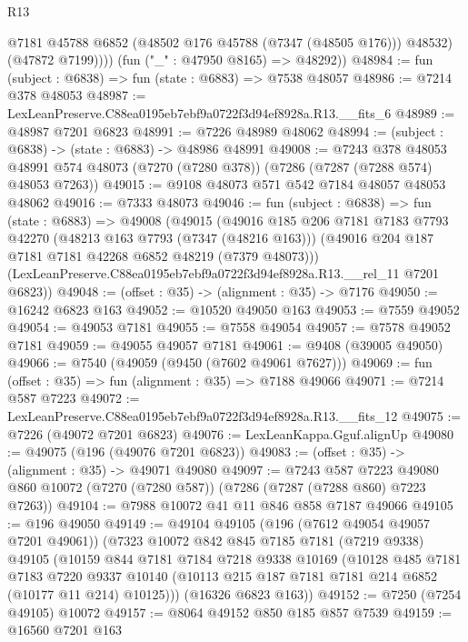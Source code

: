 \begin{lexlean}{R13}
\begin{coremodule}
              @7181
              @45788
              @6852
              (@48502 @176 @45788 (@7347 (@48505 @176)))
              @48532)
            (@47872 @7199))))
      (fun ("_" : @47950 @8165) => @48292))
@48984 := fun (subject : @6838) => fun (state : @6883) => @7538 @48057
@48986 := @7214 @378 @48053
@48987 := LexLeanPreserve.C88ea0195eb7ebf9a0722f3d94ef8928a.R13.__fits_6
@48989 := @48987 @7201 @6823
@48991 := @7226 @48989 @48062
@48994 := (subject : @6838) -> (state : @6883) -> @48986 @48991
@49008 := @7243
    @378
    @48053
    @48991
    @574
    @48073
    (@7270 (@7280 @378))
    (@7286 (@7287 (@7288 @574) @48053 @7263))
@49015 := @9108 @48073 @571 @542 @7184 @48057 @48053 @48062
@49016 := @7333 @48073
@49046 := fun (subject : @6838) =>
  fun (state : @6883) =>
  @49008
    (@49015
      (@49016
        @185
        @206
        @7181
        @7183
        @7793
        @42270
        (@48213 @163 @7793 (@7347 (@48216 @163)))
        (@49016 @204 @187 @7181 @7181 @42268 @6852 @48219 (@7379 @48073)))
      (LexLeanPreserve.C88ea0195eb7ebf9a0722f3d94ef8928a.R13.__rel_11 @7201 @6823))
@49048 := (offset : @35) -> (alignment : @35) -> @7176
@49050 := @16242 @6823 @163
@49052 := @10520 @49050 @163
@49053 := @7559 @49052
@49054 := @49053 @7181
@49055 := @7558 @49054
@49057 := @7578 @49052 @7181
@49059 := @49055 @49057 @7181
@49061 := @9408 (@39005 @49050)
@49066 := @7540 (@49059 (@9450 (@7602 @49061 @7627)))
@49069 := fun (offset : @35) => fun (alignment : @35) => @7188 @49066
@49071 := @7214 @587 @7223
@49072 := LexLeanPreserve.C88ea0195eb7ebf9a0722f3d94ef8928a.R13.__fits_12
@49075 := @7226 (@49072 @7201 @6823)
@49076 := LexLeanKappa.Gguf.alignUp
@49080 := @49075 (@196 (@49076 @7201 @6823))
@49083 := (offset : @35) -> (alignment : @35) -> @49071 @49080
@49097 := @7243
    @587
    @7223
    @49080
    @860
    @10072
    (@7270 (@7280 @587))
    (@7286 (@7287 (@7288 @860) @7223 @7263))
@49104 := @7988 @10072 @41 @11 @846 @858 @7187 @49066
@49105 := @196 @49050
@49149 := @49104
    @49105
    (@196 (@7612 @49054 @49057 @7201 @49061))
    (@7323
      @10072
      @842
      @845
      @7185
      @7181
      (@7219 @9338)
      @49105
      (@10159
        @844
        @7181
        @7184
        @7218
        @9338
        @10169
        (@10128
          @485
          @7181
          @7183
          @7220
          @9337
          @10140
          (@10113 @215 @187 @7181 @7181 @214 @6852 (@10177 @11 @214) @10125)))
      (@16326 @6823 @163))
@49152 := @7250 (@7254 @49105) @10072
@49157 := @8064 @49152 @850 @185 @857 @7539
@49159 := @16560 @7201 @163

\end{coremodule}
\end{lexlean}
